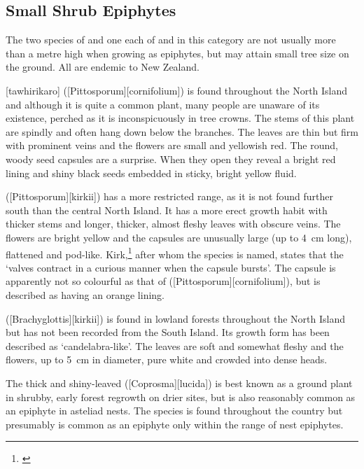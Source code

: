 \subsection{Small Shrub Epiphytes}

The two species of  and one each of  and  in this category are not usually more than a metre high when growing as epiphytes, but may attain small tree size on the ground.
All are endemic to New Zealand.

[tawhirikaro] ([Pittosporum][cornifolium]) is found throughout the North Island and although it is quite a common plant, many people are unaware of its existence, perched as it is inconspicuously in tree crowns.
The stems of this plant are spindly and often hang down below the branches.
The leaves are thin but firm with prominent veins and the flowers are small and yellowish red.
The round, woody seed capsules are a surprise.
When they open they reveal a bright red lining and shiny black seeds embedded in sticky, bright yellow fluid.

 ([Pittosporum][kirkii]) has a more restricted range, as it is not found further south than the central North Island.
It has a more erect growth habit with thicker stems and longer, thicker, almost fleshy leaves with obscure veins.
The flowers are bright yellow and the capsules are unusually large (up to \SI{4}{\centi\metre} long), flattened and pod-like.
Kirk,\footnote{\cite{kirk1869botany}} after whom the species is named, states that the `valves contract in a curious manner when the capsule bursts'.
The capsule is apparently not so colourful as that of  ([Pittosporum][cornifolium]), but is described as having an orange lining.

 ([Brachyglottis][kirkii]) is found in lowland forests throughout the North Island but has not been recorded from the South Island.
Its growth form has been described as `candelabra-like'.
The leaves are soft and somewhat fleshy and the flowers, up to \SI{5}{\centi\metre} in diameter, pure white and crowded into dense heads.

The thick and shiny-leaved  ([Coprosma][lucida]) is best known as a ground plant in shrubby, early forest regrowth on drier sites, but is also reasonably common as an epiphyte in asteliad nests.
The species is found throughout the country but presumably is common as an epiphyte only within the range of nest epiphytes.

